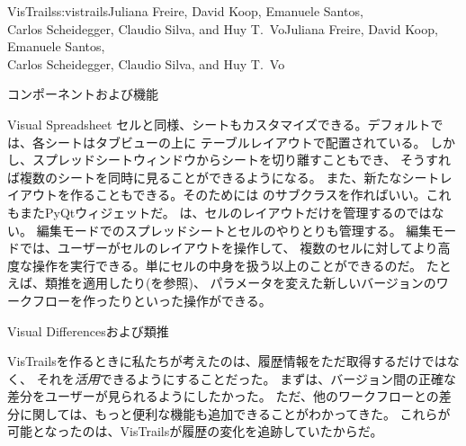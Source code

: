 \begin{aosachaptertoc}{VisTrails}{s:vistrails}{Juliana Freire, David Koop, Emanuele Santos, \\ Carlos Scheidegger, Claudio Silva, and Huy T.\ Vo}{Juliana Freire, David Koop, Emanuele Santos, \\ \hspace*{0.9cm} Carlos Scheidegger, Claudio Silva, and Huy T.\ Vo}
\begin{aosasect1}{コンポーネントおよび機能}
\begin{aosasect2}{Visual Spreadsheet}
セルと同様、シートもカスタマイズできる。デフォルトでは、各シートはタブビューの上に
テーブルレイアウトで配置されている。
しかし、スプレッドシートウィンドウからシートを切り離すこともでき、
そうすれば複数のシートを同時に見ることができるようになる。
また、新たなシートレイアウトを作ることもできる。そのためには
のサブクラスを作ればいい。これもまたPyQtウィジェットだ。
は、セルのレイアウトだけを管理するのではない。
編集モードでのスプレッドシートとセルのやりとりも管理する。
編集モードでは、ユーザーがセルのレイアウトを操作して、
複数のセルに対してより高度な操作を実行できる。単にセルの中身を扱う以上のことができるのだ。
たとえば、類推を適用したり(を参照)、
パラメータを変えた新しいバージョンのワークフローを作ったりといった操作ができる。

\end{aosasect2}

\begin{aosasect2}{Visual Differencesおよび類推}
\label{sec.vistrails.diff}

VisTrailsを作るときに私たちが考えたのは、履歴情報をただ取得するだけではなく、
それを\emph{活用}できるようにすることだった。
まずは、バージョン間の正確な差分をユーザーが見られるようにしたかった。
ただ、他のワークフローとの差分に関しては、もっと便利な機能も追加できることがわかってきた。
これらが可能となったのは、VisTrailsが履歴の変化を追跡していたからだ。


\end{aosasect2}
\end{aosasect1}
\end{aosachaptertoc}
